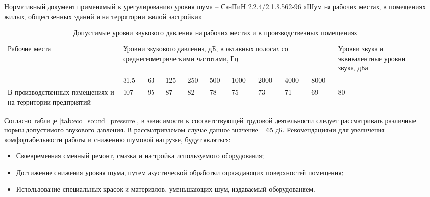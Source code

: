 Нормативный документ применимый к урегулированию уровня шума – СанПиН 2.2.4/2.1.8.562-96 «Шум на рабочих местах, в помещениях жилых, общественных зданий и на территории жилой застройки»
\begin{table}[!h]
	\begin{center}
		\caption{Допустимые уровни звукового давления на рабочих местах и в производственных помещениях}
		\begin{tabular}{|p{29mm}|
			p{8mm}|
			p{6mm}|
			p{6mm}|
			p{6mm}|
			p{6mm}|
			p{8mm}|
			p{8mm}|
			p{8mm}|
			p{6mm}|
				p{30mm}|
		}
	\hline
	Рабочие места & \multicolumn{9}{|p{100mm}|}{Уровни звукового давления, дБ, в октавных полосах со среднегеометрическими частотами, Гц } & Уровни звука и эквивалентные уровни звука, дБа \\
	\cline {2-10}
	& 31.5 & 63 & 125 & 250 & 500 & 1000 & 2000 & 4000 & 8000 & \\
	\hline
	В производственных помещениях и на территории предприятий & 107 & 95 & 87 & 82 & 78 & 75 & 73 & 71 & 69 & 80 \\
	\hline
		\end{tabular}
	\end{center}
\end{table}

\clearpage
Согласно таблице \ref{tab:eco_sound_pressure}, в зависимости к соответствующей трудовой деятельности следует рассматривать различные нормы допустимого звукового давления. В рассматриваемом случае данное значение – 65 дБ.
Рекомендациями для увеличения комфортабельности работы и снижению шумовой нагрузке, будут являться:
\begin{itemize}
	\item Своевременная сменный ремонт, смазка и настройка используемого оборудования;
	\item Достижение снижения уровня шума, путем акустической обработки ограждающих поверхностей помещения;
	\item Использование специальных красок и материалов, уменьшающих шум, издаваемый оборудованием.
\end{itemize}

